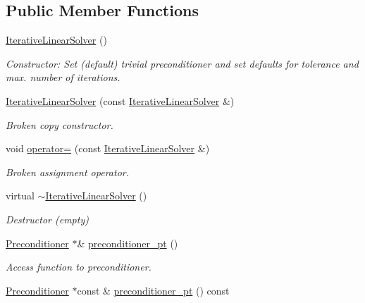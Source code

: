 \subsection*{Public Member Functions}
\begin{DoxyCompactItemize}
\item 
\hyperlink{classoomph_1_1IterativeLinearSolver_a77f4a929d741d4996f02d2c2b75670cd}{Iterative\+Linear\+Solver} ()
\begin{DoxyCompactList}\small\item\em Constructor\+: Set (default) trivial preconditioner and set defaults for tolerance and max. number of iterations. \end{DoxyCompactList}\item 
\hyperlink{classoomph_1_1IterativeLinearSolver_a96f01068a37f67a28e85c05657aac840}{Iterative\+Linear\+Solver} (const \hyperlink{classoomph_1_1IterativeLinearSolver}{Iterative\+Linear\+Solver} \&)
\begin{DoxyCompactList}\small\item\em Broken copy constructor. \end{DoxyCompactList}\item 
void \hyperlink{classoomph_1_1IterativeLinearSolver_a0f152f3c12947a48b71f35674a075a2a}{operator=} (const \hyperlink{classoomph_1_1IterativeLinearSolver}{Iterative\+Linear\+Solver} \&)
\begin{DoxyCompactList}\small\item\em Broken assignment operator. \end{DoxyCompactList}\item 
virtual \hyperlink{classoomph_1_1IterativeLinearSolver_a655eb19872606c2d05e8ee87a4fb6bc5}{$\sim$\+Iterative\+Linear\+Solver} ()
\begin{DoxyCompactList}\small\item\em Destructor (empty) \end{DoxyCompactList}\item 
\hyperlink{classoomph_1_1Preconditioner}{Preconditioner} $\ast$\& \hyperlink{classoomph_1_1IterativeLinearSolver_a800f699ec8dda290105807cb91297850}{preconditioner\+\_\+pt} ()
\begin{DoxyCompactList}\small\item\em Access function to preconditioner. \end{DoxyCompactList}\item 
\hyperlink{classoomph_1_1Preconditioner}{Preconditioner} $\ast$const  \& \hyperlink{classoomph_1_1IterativeLinearSolver_a40dc3e8bcb0ca6963d91b7c999d9b0c6}{preconditioner\+\_\+pt} () const

\end{DoxyCompactItemize}
